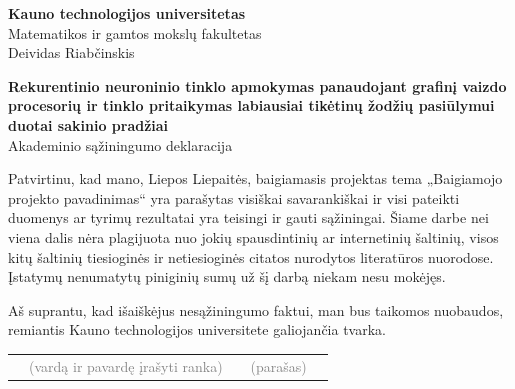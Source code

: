 

\begin{titlepage}
  \begin{center}


    \begin{figure}[H]
      \centering
    \end{figure}

    \vspace*{30pt}

    \fontXII
    \textbf{Kauno technologijos universitetas}\\
    Matematikos ir gamtos mokslų fakultetas\\
    Deividas Riabčinskis

    \vspace*{100pt}

    \fontXVIII
	   \textbf{Rekurentinio neuroninio tinklo apmokymas panaudojant grafinį vaizdo procesorių ir tinklo pritaikymas labiausiai tikėtinų žodžių pasiūlymui duotai sakinio pradžiai}\\
     \fontXIV
     Akademinio sąžiningumo deklaracija

   \end{center}

     \vspace*{40pt}

     \fontXII

     Patvirtinu, kad mano, Liepos Liepaitės, baigiamasis projektas tema „Baigiamojo projekto pavadinimas“ yra parašytas visiškai savarankiškai ir visi pateikti duomenys ar tyrimų rezultatai yra teisingi ir gauti sąžiningai. Šiame darbe nei viena dalis nėra plagijuota nuo jokių spausdintinių ar internetinių šaltinių, visos kitų šaltinių tiesioginės ir netiesioginės citatos nurodytos literatūros nuorodose. Įstatymų nenumatytų piniginių sumų už šį darbą niekam nesu mokėjęs.

     Aš suprantu, kad išaiškėjus nesąžiningumo faktui, man bus taikomos nuobaudos, remiantis Kauno technologijos universitete galiojančia tvarka.

\vspace*{40pt}

\begin{tabular}{@{}C{69.9mm}@{}@{}C{57.5mm}@{}@{}C{5.8mm}@{}@{}C{28.7mm}@{}@{}C{8mm}@{}}
  \hhline{~-~-~}
  \hhline{~-~-~}

& \textcolor{gray}{(vardą ir pavardę įrašyti ranka)} & & \textcolor{gray}{(parašas)} &
\end{tabular}


\end{titlepage}

